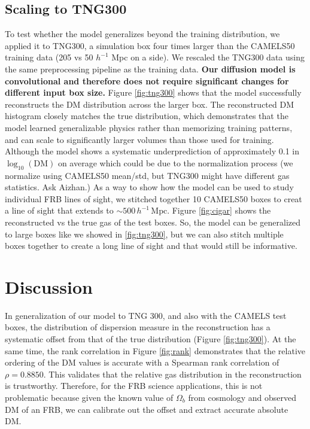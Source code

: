 \documentclass[twocolumn]{aastex631}
\begin{document}
\subsection{Scaling to TNG300}
To test whether the model generalizes beyond the training distribution, we applied it to TNG300, a simulation box four times larger than the CAMELS50 training data (205 vs 50 $h^{-1}$ Mpc on a side). We rescaled the TNG300 data using the same preprocessing pipeline as the training data. \textbf{Our diffusion model is convolutional and therefore does not require significant changes for different 
input box size.} Figure \ref{fig:tng300} shows that the model successfully reconstructs the DM distribution across the larger box. The reconstructed DM histogram closely matches the true distribution, which demonstrates that the model learned generalizable physics rather than memorizing training patterns, and can scale to significantly larger volumes than those used for training. Although the model shows a systematic underprediction of approximately 0.1 in $\log_{10}(\mathrm{DM})$ on average which could be due to the normalization process (we normalize using CAMELS50 mean/std, but TNG300 might have different gas statistics. Ask Aizhan.)
As a way to show how the model can be used to study individual FRB lines of sight, we stitched together 10 CAMELS50 boxes to creat a line of sight that extends to $\sim500\,h^{-1}\,\mathrm{Mpc}$. Figure \ref{fig:cigar} shows the reconstructed vs the true gas of the test boxes. So, the model can be generalized to large boxes like we showed in \ref{fig:tng300}, but we can also stitch multiple boxes together to create a long line of sight and that would still be informative. 

\figTNG

\section{Discussion}
\label{sec:discussion}

In generalization of our model to TNG 300, and also with the CAMELS test boxes, the distribution of dispersion measure in the reconstruction has a systematic offset from that of the true distribution (Figure \ref{fig:tng300}). At the same time, the rank correlation in Figure \ref{fig:rank} demonstrates that the relative ordering of the DM values is accurate with a Spearman rank correlation of $\rho = 0.8850$. This validates that the relative gas distribution in the reconstruction is trustworthy. Therefore, for the FRB science applications, this is not problematic because given the known value of $\Omega_b$ from cosmology and observed DM of an FRB, we can calibrate out the offset and extract accurate absolute DM. 
\end{document}
